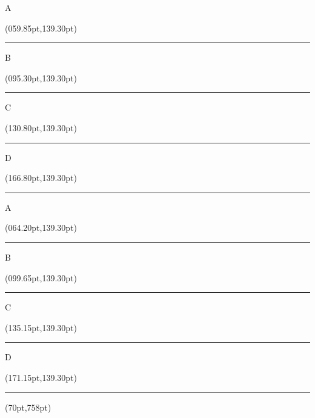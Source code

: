 \documentclass[a4paper,11pt]{article}
\begin{document}
\ifx \useenglish \undefined
	\if A\examversion \begin{textblock*}{10pt}(059.85pt,139.30pt)\rule[0mm]{3.30mm}{2.10mm}\end{textblock*} \fi
	\if B\examversion \begin{textblock*}{10pt}(095.30pt,139.30pt)\rule[0mm]{3.30mm}{2.10mm}\end{textblock*} \fi
	\if C\examversion \begin{textblock*}{10pt}(130.80pt,139.30pt)\rule[0mm]{3.30mm}{2.10mm}\end{textblock*} \fi
	\if D\examversion \begin{textblock*}{10pt}(166.80pt,139.30pt)\rule[0mm]{3.30mm}{2.10mm}\end{textblock*} \fi
\else
	\if A\examversion \begin{textblock*}{10pt}(064.20pt,139.30pt)\rule[0mm]{3.30mm}{2.10mm}\end{textblock*} \fi
	\if B\examversion \begin{textblock*}{10pt}(099.65pt,139.30pt)\rule[0mm]{3.30mm}{2.10mm}\end{textblock*} \fi
	\if C\examversion \begin{textblock*}{10pt}(135.15pt,139.30pt)\rule[0mm]{3.30mm}{2.10mm}\end{textblock*} \fi
	\if D\examversion \begin{textblock*}{10pt}(171.15pt,139.30pt)\rule[0mm]{3.30mm}{2.10mm}\end{textblock*} \fi
\fi

\begin{textblock*}{380pt}(70pt,758pt)
\begin{spacing}{1.2000}
\Large{\examcomment}
\end{spacing}
\end{textblock*}
\end{document}
